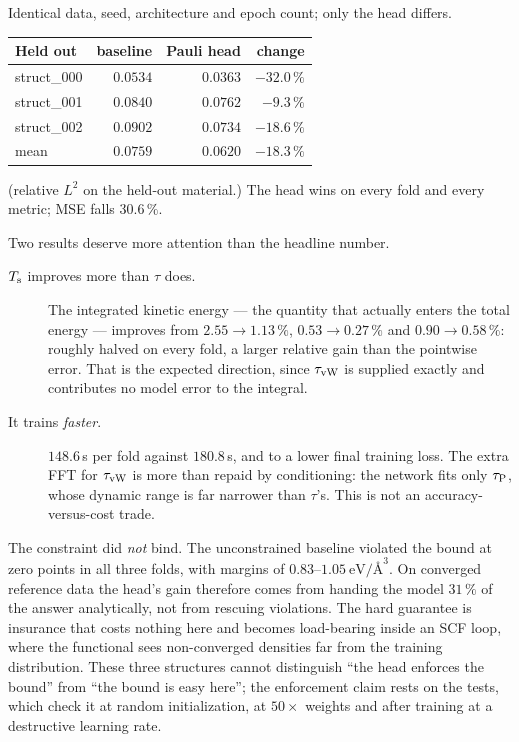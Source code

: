 Identical data, seed, architecture and epoch count; only the head differs.

\begin{center}
\begin{tabular}{@{}lrrr@{}}
\toprule
Held out & baseline & \textbf{Pauli head} & change \\
\midrule
struct\_000 & $0.0534$ & $\mathbf{0.0363}$ & $-32.0\,\%$ \\
struct\_001 & $0.0840$ & $\mathbf{0.0762}$ & $-9.3\,\%$ \\
struct\_002 & $0.0902$ & $\mathbf{0.0734}$ & $-18.6\,\%$ \\
\midrule
mean & $0.0759$ & $\mathbf{0.0620}$ & $\mathbf{-18.3\,\%}$ \\
\bottomrule
\end{tabular}
\end{center}

(relative $L^2$ on the held-out material.) The head wins on every fold and every
metric; MSE falls $30.6\,\%$.

Two results deserve more attention than the headline number.

\begin{description}
  \item[$T_{\mathrm{s}}$ improves more than $\tau$ does.] The integrated kinetic energy ---
    the quantity that actually enters the total energy --- improves from
    $2.55\to1.13\,\%$, $0.53\to0.27\,\%$ and $0.90\to0.58\,\%$: roughly halved
    on every fold, a larger relative gain than the pointwise error. That is the
    expected direction, since $\tau_{\mathrm{vW}}$ is supplied exactly and contributes no
    model error to the integral.
  \item[It trains \emph{faster}.] $148.6$\,s per fold against $180.8$\,s, and to
    a lower final training loss. The extra FFT for $\tau_{\mathrm{vW}}$ is more than repaid
    by conditioning: the network fits only $\tau_{\mathrm{P}}$, whose dynamic range is far
    narrower than $\tau$'s. This is not an accuracy-versus-cost trade.
\end{description}

\begin{pwarn}
The constraint did \emph{not} bind. The unconstrained baseline violated the
bound at zero points in all three folds, with margins of $0.83$--$1.05\
\mathrm{eV}/\text{\AA}^3$. On converged reference data the head's gain therefore
comes from handing the model $31\,\%$ of the answer analytically, not from
rescuing violations. The hard guarantee is insurance that costs nothing here and
becomes load-bearing inside an SCF loop, where the functional sees
non-converged densities far from the training distribution. These three
structures cannot distinguish ``the head enforces the bound'' from ``the bound
is easy here''; the enforcement claim rests on the tests, which check it at
random initialization, at $50\times$ weights and after training at a
destructive learning rate.
\end{pwarn}


